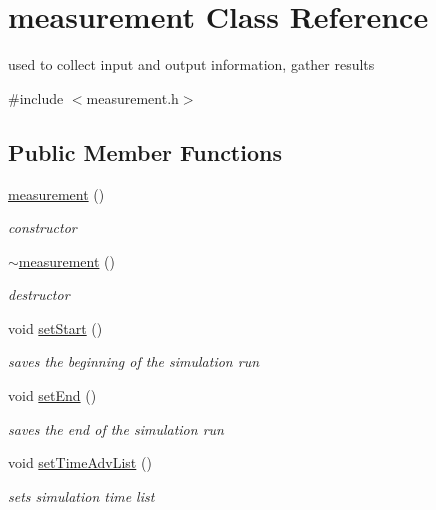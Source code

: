 \hypertarget{classmeasurement}{
\section{measurement Class Reference}
\label{classmeasurement}
}


used to collect input and output information, gather results  




{\ttfamily \#include $<$measurement.h$>$}

\subsection*{Public Member Functions}
\begin{DoxyCompactItemize}
\item 
\hyperlink{classmeasurement_a94ea175b4a5eecf4c60af94b7d630ca0}{measurement} ()
\begin{DoxyCompactList}\small\item\em constructor \item\end{DoxyCompactList}\item 
\hyperlink{classmeasurement_adad6fad962fe7f356188e2d108069ab9}{$\sim$measurement} ()
\begin{DoxyCompactList}\small\item\em destructor \item\end{DoxyCompactList}\item 
void \hyperlink{classmeasurement_a18541883e2ecd3b899577809bc318987}{setStart} ()
\begin{DoxyCompactList}\small\item\em saves the beginning of the simulation run \item\end{DoxyCompactList}\item 
void \hyperlink{classmeasurement_adfeee2a53faaa6c4de885f274e31e84f}{setEnd} ()
\begin{DoxyCompactList}\small\item\em saves the end of the simulation run \item\end{DoxyCompactList}\item 
void \hyperlink{classmeasurement_ab92b9dab0ee6ac312170b5536858fc8c}{setTimeAdvList} ()
\begin{DoxyCompactList}\small\item\em sets simulation time list \item\end{DoxyCompactList}\item 

\end{DoxyCompactItemize}
